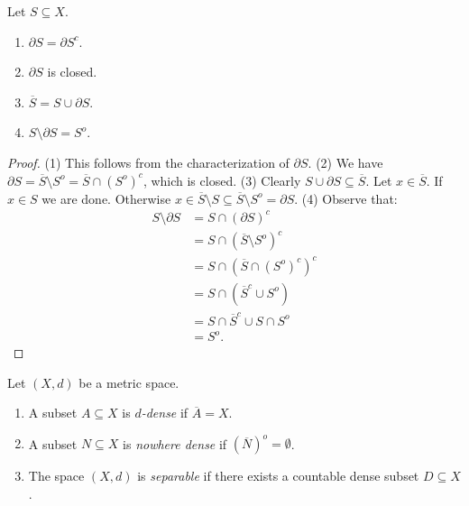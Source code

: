     \begin{proposition}
        Let $S \subseteq X$.
        \begin{enumerate}[label = (\arabic*),itemsep=1pt,topsep=3pt]
            \item $\partial S = \partial S^c$.
            \item $\partial S$ is closed.
            \item $\overline{S} = S \cup \partial S$.
            \item $S \setminus \partial S = S^o$.
        \end{enumerate}
    \end{proposition}
        \begin{proof}
            (1) This follows from the characterization of $\partial S$. (2) We have $\partial S = \overline{S} \setminus S^o = \overline{S} \cap (S^o)^c$, which is closed. (3) Clearly $S \cup \partial S \subseteq \overline{S}$. Let $x \in \overline{S}$. If $x \in S$ we are done. Otherwise $x \in \overline{S} \setminus S \subseteq \overline{S} \setminus S^o = \partial S$. (4) Observe that:
                \begin{equation*}
                \begin{split}
                    S \setminus \partial S 
                    & = S \cap (\partial S) ^c \\
                    & = S \cap (\overline{S} \setminus S^o)^c \\
                    & = S \cap (\overline {S} \cap (S^o)^c)^c \\
                    & = S \cap (\overline{S}^c \cup S^o ) \\
                    & = S \cap \overline{S}^c \cup S \cap S^o \\
                    & = S^o.
                \end{split}
                \end{equation*}
        \end{proof}

    \begin{definition}
        Let $(X,d)$ be a metric space.
        \begin{enumerate}[label = (\arabic*),itemsep=1pt,topsep=3pt]
            \item A subset $A \subseteq X$ is \textit{$d$-dense} if $\overline{A} = X$.
            \item A subset $N \subseteq X$ is \textit{nowhere dense} if $(\overline{N})^o = \emptyset$.
            \item The space $(X,d)$ is \textit{separable} if there exists a countable dense subset $D \subseteq X$.
        \end{enumerate}
    \end{definition}

